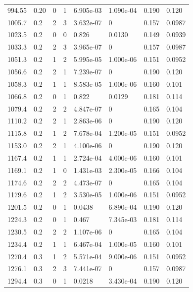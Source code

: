 \documentclass[preview]{standalone}
\begin{document}
{{{\begin{tabular}{L{1.2cm}C{1.2cm} C{0.3cm}C{0.5cm} C{1.4cm}C{1.4cm} C{1.4cm}C{1.4cm}}
  994.55  &  0.20  & 0     &  1 &  6.905e-03  & 1.090e-04  & 0.190 &  0.120   \\ 
  1005.7  &   0.2  & 2     &  3 &  3.632e-07  & 0  & 0.157 &  0.0987   \\ 
  1023.5  &   0.2  & 0     &  0 &  0.826  & 0.0130  & 0.149 &  0.0939   \\ 
  1033.3  &   0.2  & 2     &  3 &  3.965e-07  & 0  & 0.157 &  0.0987   \\ 
  1051.3  &   0.2  & 1     &  2 &  5.995e-05  & 1.000e-06  & 0.151 &  0.0952   \\ 
  1056.6  &   0.2  & 2     &  1 &  7.239e-07  & 0  & 0.190 &  0.120   \\ 
  1058.3  &   0.2  & 1     &  1 &  8.583e-05  & 1.000e-06  & 0.160 &  0.101   \\ 
  1066.8  &   0.2  & 0     &  1 &  0.822  & 0.0129  & 0.181 &  0.114   \\ 
  1079.4  &   0.2  & 2     &  2 &  4.847e-07  & 0  & 0.165 &  0.104   \\ 
  1110.2  &   0.2  & 2     &  1 &  2.863e-06  & 0  & 0.190 &  0.120   \\ 
  1115.8  &   0.2  & 1     &  2 &  7.678e-04  & 1.200e-05  & 0.151 &  0.0952   \\ 
  1153.0  &   0.2  & 2     &  1 &  4.100e-06  & 0  & 0.190 &  0.120   \\ 
  1167.4  &   0.2  & 1     &  1 &  2.724e-04  & 4.000e-06  & 0.160 &  0.101   \\ 
  1169.1  &   0.2  & 1     &  0 &  1.431e-03  & 2.300e-05  & 0.166 &  0.104   \\ 
  1174.6  &   0.2  & 2     &  2 &  4.473e-07  & 0  & 0.165 &  0.104   \\ 
  1179.6  &   0.2  & 1     &  2 &  3.530e-05  & 1.000e-06  & 0.151 &  0.0952   \\ 
  1201.5  &   0.2  & 0     &  1 &  0.0438  & 6.890e-04  & 0.190 &  0.120   \\ 
  1224.3  &   0.2  & 0     &  1 &  0.467  & 7.345e-03  & 0.181 &  0.114   \\ 
  1230.5  &   0.2  & 2     &  2 &  1.107e-06  & 0  & 0.165 &  0.104   \\ 
  1234.4  &   0.2  & 1     &  1 &  6.467e-04  & 1.000e-05  & 0.160 &  0.101   \\ 
  1270.4  &   0.3  & 1     &  2 &  5.571e-04  & 9.000e-06  & 0.151 &  0.0952   \\ 
  1276.1  &   0.3  & 2     &  3 &  7.441e-07  & 0  & 0.157 &  0.0987   \\ 
  1294.4  &   0.3  & 0     &  1 &  0.0218  & 3.430e-04  & 0.190 &  0.120   \\ 

\end{tabular}}}}
\end{document}
